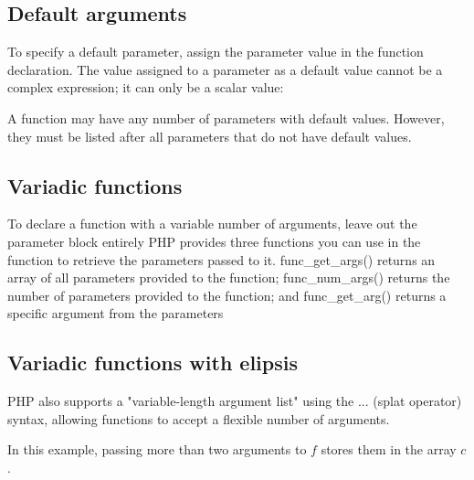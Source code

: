\documentclass{report}
\begin{document}
\bigbreak \noindent 
\subsection{Default arguments}
\bigbreak \noindent 
To specify a default parameter, assign the parameter value in the function declaration.
The value assigned to a parameter as a default value cannot be a complex expression;
it can only be a scalar value:
\bigbreak \noindent 
{}
\bigbreak \noindent 
A function may have any number of parameters with default values. However, they must be listed after all parameters that do not have default values.

\bigbreak \noindent 
\subsection{Variadic functions}
\bigbreak \noindent 
To declare a function with a variable number of arguments, leave out the parameter block entirely
\bigbreak \noindent 
PHP provides three functions you can use in the function to retrieve the parameters
passed to it. func\_get\_args() returns an array of all parameters provided to the function;
func\_num\_args() returns the number of parameters provided to the function; and
func\_get\_arg() returns a specific argument from the parameters
\bigbreak \noindent 
{}

\bigbreak \noindent 
\subsection{Variadic functions with elipsis} 
\bigbreak \noindent 
PHP also supports a "variable-length argument list" using the ... (splat operator) syntax, allowing functions to accept a flexible number of arguments.
\bigbreak \noindent 
{}
\bigbreak \noindent 
In this example, passing more than two arguments to $f$ stores them in the array $c$.
\end{document}

